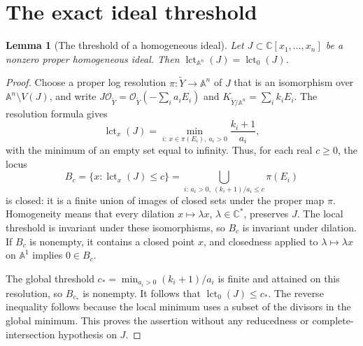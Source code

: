 \documentclass[11pt]{article}
\numberwithin{equation}{section}
\newtheorem{lemma}[theorem]{Lemma}
\theoremstyle{remark}
\newcommand{\A}{\mathbb A}
\newcommand{\C}{\mathbb C}
\newcommand{\lct}{\operatorname{lct}}
\begin{document}
\section{The exact ideal threshold}
\begin{lemma}[The threshold of a homogeneous ideal]\label{lem:cone}
Let $J\subset\C[x_1,\ldots,x_n]$ be a nonzero proper homogeneous
ideal. Then $\lct_{\A^n}(J)=\lct_0(J)$.
\end{lemma}
\begin{proof}
Choose a proper log resolution $\pi:\widetilde Y\to\A^n$ of $J$
that is an isomorphism over $\A^n\setminus V(J)$, and write
$J\mathcal O_{\widetilde Y}=\mathcal O_{\widetilde Y}(-\sum_i a_iE_i)$
and $K_{\widetilde Y/\A^n}=\sum_i k_iE_i$. The resolution formula
\cite[Proposition 1.5]{Mpairs} gives
\[
 \lct_x(J)=\min_{i:\,x\in\pi(E_i),\ a_i>0}\frac{k_i+1}{a_i},
\]
with the minimum of an empty set equal to infinity. Thus, for
each real $c\ge0$, the locus
\[
 B_c=\{x:\lct_x(J)\le c\}
     =\bigcup_{i:\,a_i>0,\ (k_i+1)/a_i\le c}\pi(E_i)
\]
is closed: it is a finite union of images of closed sets under
the proper map $\pi$. Homogeneity means that every dilation
$x\mapsto\lambda x$, $\lambda\in\C^*$, preserves $J$.
The local threshold is invariant under these isomorphisms, so
$B_c$ is invariant under dilation. If $B_c$ is nonempty, it
contains a closed point $x$, and closedness applied to
$\lambda\mapsto\lambda x$ on $\A^1$ implies $0\in B_c$.

The global threshold $c_*=\min_{a_i>0}(k_i+1)/a_i$ is finite
and attained on this resolution, so $B_{c_*}$ is nonempty.
It follows that $\lct_0(J)\le c_*$. The reverse inequality
follows because the local minimum uses a subset of the divisors
in the global minimum. This proves the assertion without any
reducedness or complete-intersection hypothesis on $J$.
\end{proof}
\end{document}
